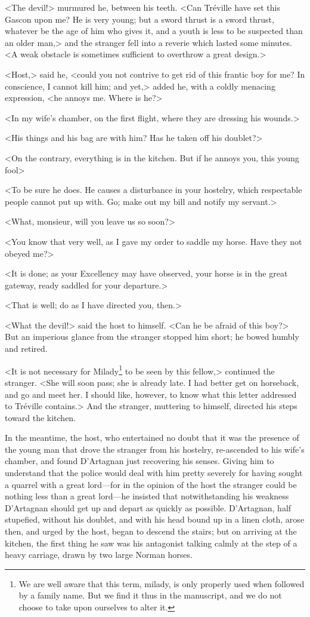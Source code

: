 <The devil!> murmured he, between his teeth. <Can Tréville have set this Gascon upon me? He is very young; but a sword thrust is a sword thrust, whatever be the age of him who gives it, and a youth is less to be suspected than an older man,> and the stranger fell into a reverie which lasted some minutes. <A weak obstacle is sometimes sufficient to overthrow a great design.>

<Host,> said he, <could you not contrive to get rid of this frantic boy for me? In conscience, I cannot kill him; and yet,> added he, with a coldly menacing expression, <he annoys me. Where is he?> 

<In my wife's chamber, on the first flight, where they are dressing his wounds.> 

<His things and his bag are with him? Has he taken off his doublet?> 

<On the contrary, everything is in the kitchen. But if he annoys you, this young fool\longdash> 

<To be sure he does. He causes a disturbance in your hostelry, which respectable people cannot put up with. Go; make out my bill and notify my servant.> 

<What, monsieur, will you leave us so soon?> 

<You know that very well, as I gave my order to saddle my horse. Have they not obeyed me?> 

<It is done; as your Excellency may have observed, your horse is in the great gateway, ready saddled for your departure.> 

<That is well; do as I have directed you, then.> 

<What the devil!> said the host to himself. <Can he be afraid of this boy?> But an imperious glance from the stranger stopped him short; he bowed humbly and retired. 

<It is not necessary for Milady\footnote{We are well aware that this term, milady, is only properly used when followed by a family name. But we find it thus in the manuscript, and we do not choose to take upon ourselves to alter it.} to be seen by this fellow,> continued the stranger. <She will soon pass; she is already late. I had better get on horseback, and go and meet her. I should like, however, to know what this letter addressed to Tréville contains.> And the stranger, muttering to himself, directed his steps toward the kitchen.

In the meantime, the host, who entertained no doubt that it was the presence of the young man that drove the stranger from his hostelry, re-ascended to his wife's chamber, and found D'Artagnan just recovering his senses. Giving him to understand that the police would deal with him pretty severely for having sought a quarrel with a great lord—for in the opinion of the host the stranger could be nothing less than a great lord—he insisted that notwithstanding his weakness D'Artagnan should get up and depart as quickly as possible. D'Artagnan, half stupefied, without his doublet, and with his head bound up in a linen cloth, arose then, and urged by the host, began to descend the stairs; but on arriving at the kitchen, the first thing he saw was his antagonist talking calmly at the step of a heavy carriage, drawn by two large Norman horses. 

